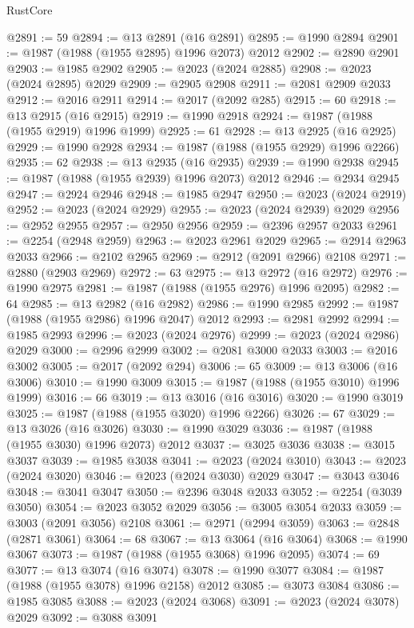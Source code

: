 \begin{lexlean}{RustCore}
\begin{coremodule}
@2891 := 59
@2894 := @13 @2891 (@16 @2891)
@2895 := @1990 @2894
@2901 := @1987 (@1988 (@1955 @2895) @1996 @2073) @2012
@2902 := @2890 @2901
@2903 := @1985 @2902
@2905 := @2023 (@2024 @2885)
@2908 := @2023 (@2024 @2895) @2029
@2909 := @2905 @2908
@2911 := @2081 @2909 @2033
@2912 := @2016 @2911
@2914 := @2017 (@2092 @285)
@2915 := 60
@2918 := @13 @2915 (@16 @2915)
@2919 := @1990 @2918
@2924 := @1987 (@1988 (@1955 @2919) @1996 @1999)
@2925 := 61
@2928 := @13 @2925 (@16 @2925)
@2929 := @1990 @2928
@2934 := @1987 (@1988 (@1955 @2929) @1996 @2266)
@2935 := 62
@2938 := @13 @2935 (@16 @2935)
@2939 := @1990 @2938
@2945 := @1987 (@1988 (@1955 @2939) @1996 @2073) @2012
@2946 := @2934 @2945
@2947 := @2924 @2946
@2948 := @1985 @2947
@2950 := @2023 (@2024 @2919)
@2952 := @2023 (@2024 @2929)
@2955 := @2023 (@2024 @2939) @2029
@2956 := @2952 @2955
@2957 := @2950 @2956
@2959 := @2396 @2957 @2033
@2961 := @2254 (@2948 @2959)
@2963 := @2023 @2961 @2029
@2965 := @2914 @2963 @2033
@2966 := @2102 @2965
@2969 := @2912 (@2091 @2966) @2108
@2971 := @2880 (@2903 @2969)
@2972 := 63
@2975 := @13 @2972 (@16 @2972)
@2976 := @1990 @2975
@2981 := @1987 (@1988 (@1955 @2976) @1996 @2095)
@2982 := 64
@2985 := @13 @2982 (@16 @2982)
@2986 := @1990 @2985
@2992 := @1987 (@1988 (@1955 @2986) @1996 @2047) @2012
@2993 := @2981 @2992
@2994 := @1985 @2993
@2996 := @2023 (@2024 @2976)
@2999 := @2023 (@2024 @2986) @2029
@3000 := @2996 @2999
@3002 := @2081 @3000 @2033
@3003 := @2016 @3002
@3005 := @2017 (@2092 @294)
@3006 := 65
@3009 := @13 @3006 (@16 @3006)
@3010 := @1990 @3009
@3015 := @1987 (@1988 (@1955 @3010) @1996 @1999)
@3016 := 66
@3019 := @13 @3016 (@16 @3016)
@3020 := @1990 @3019
@3025 := @1987 (@1988 (@1955 @3020) @1996 @2266)
@3026 := 67
@3029 := @13 @3026 (@16 @3026)
@3030 := @1990 @3029
@3036 := @1987 (@1988 (@1955 @3030) @1996 @2073) @2012
@3037 := @3025 @3036
@3038 := @3015 @3037
@3039 := @1985 @3038
@3041 := @2023 (@2024 @3010)
@3043 := @2023 (@2024 @3020)
@3046 := @2023 (@2024 @3030) @2029
@3047 := @3043 @3046
@3048 := @3041 @3047
@3050 := @2396 @3048 @2033
@3052 := @2254 (@3039 @3050)
@3054 := @2023 @3052 @2029
@3056 := @3005 @3054 @2033
@3059 := @3003 (@2091 @3056) @2108
@3061 := @2971 (@2994 @3059)
@3063 := @2848 (@2871 @3061)
@3064 := 68
@3067 := @13 @3064 (@16 @3064)
@3068 := @1990 @3067
@3073 := @1987 (@1988 (@1955 @3068) @1996 @2095)
@3074 := 69
@3077 := @13 @3074 (@16 @3074)
@3078 := @1990 @3077
@3084 := @1987 (@1988 (@1955 @3078) @1996 @2158) @2012
@3085 := @3073 @3084
@3086 := @1985 @3085
@3088 := @2023 (@2024 @3068)
@3091 := @2023 (@2024 @3078) @2029
@3092 := @3088 @3091

\end{coremodule}
\end{lexlean}
